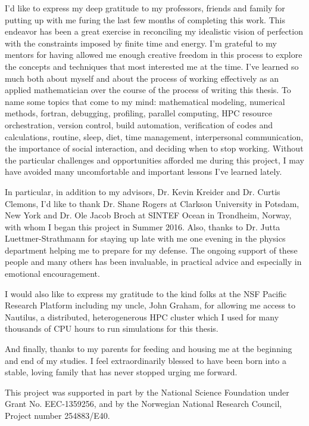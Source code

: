 \begin{acknowledgements}
I'd like to express my deep gratitude to my professors, friends and family for putting up with me furing the last few months of completing this work.
This endeavor has been a great exercise in reconciling my idealistic vision of perfection with the constraints imposed by finite time and energy.
I'm grateful to my mentors for having allowed me enough creative freedom in this process to explore the concepts and techniques that most interested me at the time.
I've learned so much both about myself and about the process of working effectively as an applied mathematician over the course of the process of writing this thesis.
To name some topics that come to my mind: mathematical modeling, numerical methods, fortran, debugging, profiling, parallel computing, HPC resource orchestration, version control, build automation, verification of codes and calculations, routine, sleep, diet, time management, interpersonal communication, the importance of social interaction, and deciding when to stop working.
Without the particular challenges and opportunities afforded me during this project, I may have avoided many uncomfortable and important lessons I've learned lately.

In particular, in addition to my advisors, Dr. Kevin Kreider and Dr. Curtis Clemons, I'd like to thank Dr. Shane Rogers at Clarkson University in Potsdam, New York and Dr. Ole Jacob Broch at SINTEF Ocean in Trondheim, Norway, with whom I began this project in Summer 2016.
Also, thanks to Dr. Jutta Luettmer-Strathmann for staying up late with me one evening in the physics department helping me to prepare for my defense.
The ongoing support of these people and many others has been invaluable, in practical advice and especially in emotional encouragement.

I would also like to express my gratitude to the kind folks at the NSF Pacific Research Platform including my uncle, John Graham, for allowing me access to Nautilus, a distributed, heterogenerous HPC cluster which I used for many thousands of CPU hours to run simulations for this thesis.

And finally, thanks to my parents for feeding and housing me at the beginning and end of my studies.
I feel extraordinarily blessed to have been born into a stable, loving family that has never stopped urging me forward.

\vfill

This project was supported in part by the National Science
Foundation under Grant No. EEC-1359256, and by the Norwegian National Research
Council, Project number 254883/E40.

\end{acknowledgements}







